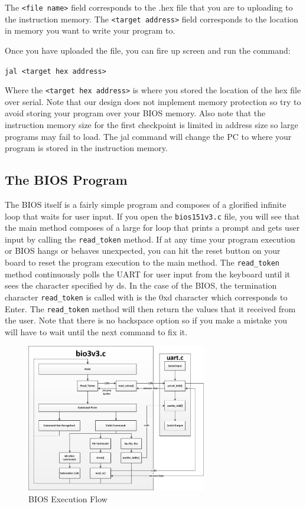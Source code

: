 \documentclass[11pt]{article}
\begin{document}
The \verb|<file name>| field corresponds to the .hex file that you are to uploading to the instruction
memory. The \verb|<target address>| field corresponds to the location in memory you want to write
your program to.

Once you have uploaded the file, you can fire up screen and run the command:

\verb|jal <target hex address>|

Where the \verb|<target hex address>| is where you stored the location of the hex file over
serial. Note that our design does not implement memory protection so try to avoid storing your
program over your BIOS memory. Also note that the instruction memory size for the first
checkpoint is limited in address size so large programs may fail to load.
The jal command will change the PC to where your program is stored in the instruction
memory.

\subsection{The BIOS Program}
The BIOS itself is a fairly simple program and composes of a glorified infinite loop that waits for
user input. If you open the \verb|bios151v3.c| file, you will see that the main method composes of a
large for loop that prints a prompt and gets user input by calling the \verb|read_token| method.
If at any time your program execution or BIOS hangs or behaves unexpected, you can hit the
reset button on your board to reset the program execution to the main method.
The \verb|read_token| method continuously polls the UART for user input from the keyboard until it
sees the character specified by ds. In the case of the BIOS, the termination character
\verb|read_token| is called with is the 0xd character which corresponds to Enter.
The \verb|read_token| method will then return the values that it received from the user. Note that
there is no backspace option so if you make a mistake you will have to wait until the next
command to fix it.

\begin{figure}[H]
  \centering
  \includegraphics[width=0.7\textwidth]{bios_flow.png}
  \caption{BIOS Execution Flow}
\end{figure}
\end{document}
